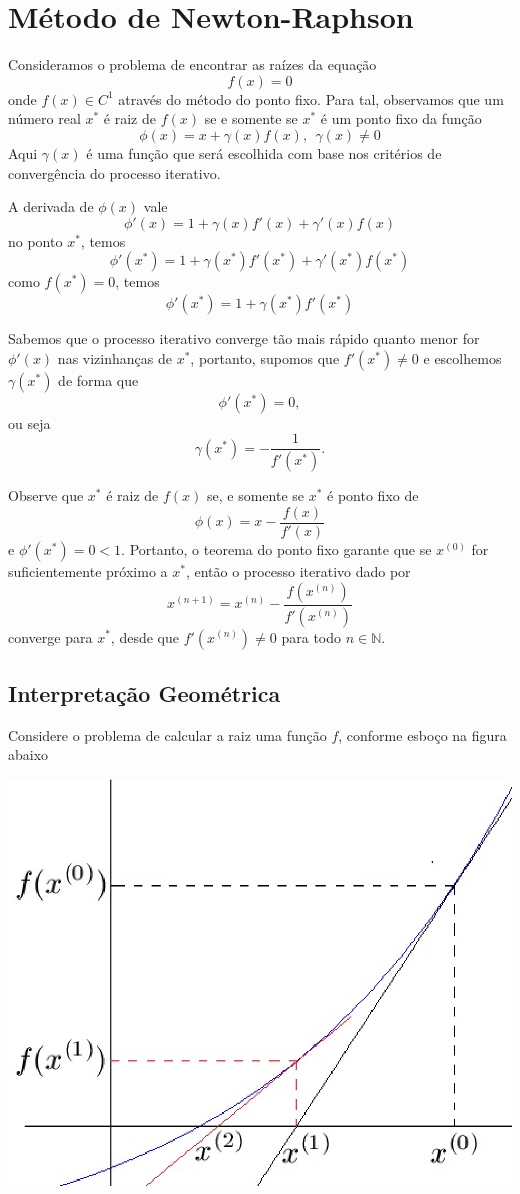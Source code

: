 \section{Método de Newton-Raphson}

Consideramos o problema de encontrar as raízes da equação
$$f(x)=0$$ onde $f(x)\in C^1$ através do método do ponto fixo.
Para tal, observamos que um número real $x^*$ é raiz de $f(x)$ se e somente se $x^*$ é um ponto fixo da função
$$\phi(x)=x+\gamma(x)f(x), ~~\gamma(x)\neq 0$$
Aqui $\gamma(x)$ é uma função que será escolhida com base nos critérios de convergência do processo iterativo.


A derivada de $\phi(x)$ vale
$$\phi'(x)=1+\gamma(x)f'(x)+\gamma'(x)f(x)$$
no ponto $x^*$, temos
$$\phi'(x^*)=1+\gamma(x^*)f'(x^*)+\gamma'(x^*)f(x^*)$$
como $f(x^*)=0$, temos
$$\phi'(x^*)=1+\gamma(x^*)f'(x^*)$$

Sabemos que o processo iterativo converge tão mais rápido quanto menor for $\phi'(x)$ nas  vizinhanças de $x^*$, portanto, supomos que $f'(x^*)\neq 0$ e escolhemos $\gamma(x^*)$ de forma que
$$\phi'(x^*)=0,$$ ou seja
$$\gamma(x^*)=-\frac{1}{f'(x^*)}.$$

Observe que $x^*$ é raiz de $f(x)$ se, e somente se $x^*$ é ponto fixo de
$$\phi(x)=x-\frac{f(x)}{f'(x)}$$
e $\phi'(x^*)=0<1$. Portanto, o teorema do ponto fixo garante que se $x^{(0)}$ for suficientemente próximo a $x^*$, então o processo iterativo dado por
$$x^{(n+1)}=x^{(n)}-\frac{f(x^{(n)})}{f'(x^{(n)})}$$
converge para $x^*$, desde que $f'(x^{(n)})\neq 0 $ para todo $n\in\mathbb{N}$.

\subsection{Interpretação Geométrica}

Considere o problema de calcular a raiz uma função $f$, conforme esboço na figura abaixo

\begin{center}
\includegraphics[scale=.4]{./cap_equacao1d/pics/fig_Newton.eps}
\end{center}

